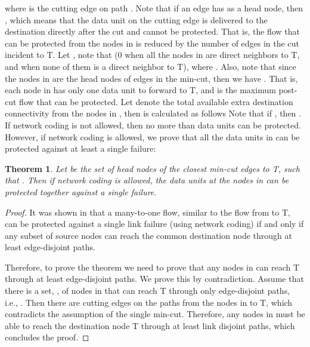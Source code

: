\documentclass[conference]{IEEEtran}
\newtheorem{theorem}{Theorem}
\begin{document}
 where  is the cutting edge on path . Note that if an edge  has  as a head node, then , which means that the data unit on the cutting edge  is delivered to the destination directly after the cut and cannot be protected. That is, the flow that can be protected from the nodes in  is reduced by the number of edges in the cut incident to T. Let , note that  (0 when all the nodes in  are direct neighbors to T, and  when none of them is a direct neighbor to T), where . Also, note that since the nodes in  are the head nodes of edges in the min-cut, then we have . That is, each node in  has only one data unit to forward to T, and  is the maximum post-cut flow that can be protected. Let  denote the total available extra destination connectivity from the nodes in , then  is calculated as follows  Note that if , then . If network coding is not allowed, then no more than  data units can be protected. However, if network coding is allowed, we prove that all the data units in  can be protected against at least a single failure:



\begin{theorem}
Let  be the set of head nodes of the closest min-cut edges to T, such that . Then if network coding is allowed, the data units at the nodes in  can be protected together against a single failure.  
\end{theorem} 

\begin{proof}
It was shown in \cite{OA09} that a many-to-one flow, similar to the flow from  to T, can be protected against a single link failure (using network coding) if and only if any subset of  source nodes can reach the common destination node through at least  edge-disjoint paths. 

Therefore, to prove the theorem we need to prove that any  nodes in  can reach T through at least  edge-disjoint paths. We prove this by contradiction. Assume that there is a set, , of  nodes in  that can reach T through only  edge-disjoint paths, i.e., . Then there are  cutting edges on the  paths from the nodes in  to T, which contradicts the assumption of the single min-cut. Therefore, any  nodes in  must be able to reach the destination node T through at least  link disjoint paths, which concludes the proof.
\end{proof}
\end{document}
